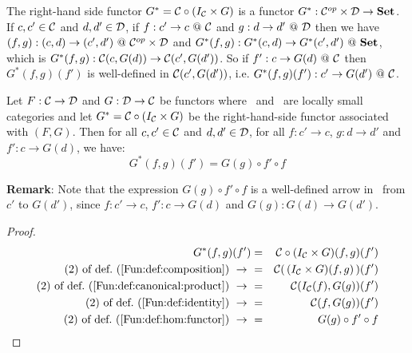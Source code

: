The right-hand side functor $G^{*}=\mbox{$\cal C$}\circ(I_{\cal C}\times G)$ is a functor
$G^{*}:\mbox{${\cal C}^{op}$}\times\mbox{$\cal D$}\to\mbox{\bf Set}$. If $c,c'\in\mbox{$\cal C$}$ and $d,d'\in\mbox{$\cal D$}$, if 
$f:c'\to c\ @\ \mbox{$\cal C$}$ and $g:d\to d'\ @\ \mbox{$\cal D$}$ then we have $(f,g):(c,d)\to
(c',d')\ @\ \mbox{${\cal C}^{op}$}\times\mbox{$\cal D$}$ and $G^{*}(f,g):G^{*}(c,d)\to G^{*}(c',d')\ @\ \Set$, 
which is $G^{*}(f,g):\mbox{$\cal C$}(c,G(d))\to\mbox{$\cal C$}(c',G(d'))$. So if 
$f':c\to G(d)\ @\ \mbox{$\cal C$}$ then $G^{*}(f,g)(f')$ is well-defined in
$\mbox{$\cal C$}(c',G(d'))$, i.e. $G^{*}(f,g)(f'):c'\to G(d')\ @\ \Cat$.
\begin{prop}\label{Adj:prop:rhs:arrow}
    Let $F:\mbox{$\cal C$}\to\mbox{$\cal D$}$ and $G:\mbox{$\cal D$}\to\mbox{$\cal C$}$ be functors where \Cat\ and \Dat\ 
    are locally small categories and let $G^{*}=\mbox{$\cal C$}\circ(I_{\cal C}\times G)$
    be the right-hand-side functor associated with $(F,G)$. Then for all 
    $c,c'\in\mbox{$\cal C$}$ and $d,d'\in\mbox{$\cal D$}$, for all $f:c'\to c$, $g:d\to d'$
    and $f':c\to G(d)$, we have:
        \[
            G^{*}(f,g)(f') = G(g) \circ f'\circ f
        \]
\end{prop}
\noindent
{\bf Remark}: Note that the expression $G(g)\circ f'\circ f$ is a well-defined
arrow in \Cat\ from $c'$ to $G(d')$, since $f:c'\to c$, $f':c\to G(d)$
and $G(g):G(d)\to G(d')$.

\noindent
\begin{proof}
    \begin{eqnarray*}G^{*}(f,g)(f')
        &=&\Cat\circ(I_{\cal C}\times G)(f,g)(f')\\
        \mbox{$(2)$ of def.~(\ref{Fun:def:composition})}\ \to\ 
        &=&\Cat(\,(I_{\cal C}\times G)(f,g)\,)(f')\\
        \mbox{$(2)$ of def.~(\ref{Fun:def:canonical:product})}\ \to\ 
        &=&\Cat(I_{\cal C}(f),G(g))(f')\\
        \mbox{$(2)$ of def.~(\ref{Fun:def:identity})}\ \to\ 
        &=&\Cat(f,G(g))(f')\\
        \mbox{$(2)$ of def.~(\ref{Fun:def:hom:functor})}\ \to\ 
        &=&G(g)\circ f'\circ f
    \end{eqnarray*}
\end{proof}

